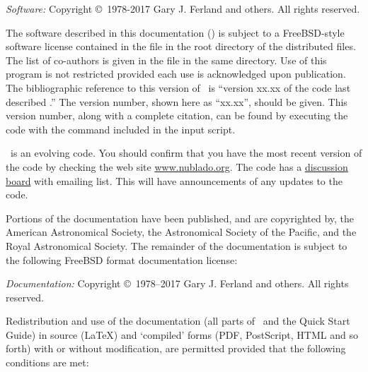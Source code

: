 {\small
\noindent
{\em Software:} Copyright \copyright\ 1978-2017 Gary J. Ferland and others. All rights reserved.

\vspace{1em}

\noindent
The software described in this documentation (\Cloudy) is subject
to a FreeBSD-style software license
contained in the file  in the
root directory of the distributed files.
The list of co-authors is given in the file
 in the same directory.
Use of this program is not restricted provided each use is
acknowledged upon publication.
The bibliographic reference to this version of \Cloudy\ is
``version xx.xx
of the code last described \citet{CloudyReview}.''
The version number, shown here as ``xx.xx'', should be
given.
This version number, along with a complete citation,
can be found by executing the code with the 
 command included in the input script.

\vspace{1em}

\noindent
\Cloudy\ is an evolving code.
You should confirm that you have the most recent
version of the code by checking the web site
\href{http://www.nublado.org}{www.nublado.org}.
The code has a
\href{https://cloudyastrophysics.groups.io}{discussion board} with emailing list.
This will have announcements of any updates to the code.\par

\vspace{1em}

\noindent
Portions of the documentation have been published, and are copyrighted by, the
American Astronomical Society, the Astronomical Society of the Pacific, and
the Royal Astronomical Society. The remainder of the documentation is subject
to the following FreeBSD format documentation license:

\vspace{1em}

\noindent
{\em Documentation:} Copyright \copyright\ 1978--2017 Gary J. Ferland and others. All rights reserved.

\vspace{1em}

\noindent
Redistribution and use of the documentation (all parts of \Hazy\ and the
Quick Start Guide) in source (\LaTeX) and `compiled' forms (PDF, PostScript,
HTML and so forth) with or without modification, are permitted provided that
the following conditions are met:

}
